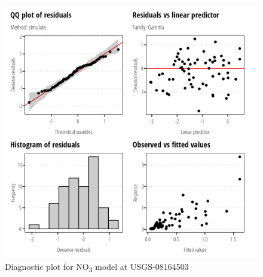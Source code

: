 \documentclass[
]{article}
\begin{document}
\clearpage

\begin{figure}[h]

{\centering \includegraphics{model_assessment_files/figure-pdf/unnamed-chunk-52-1.png}

}

\caption{Diagnostic plot for NO\textsubscript{3} model at USGS-08164503}

\end{figure}
\end{document}
